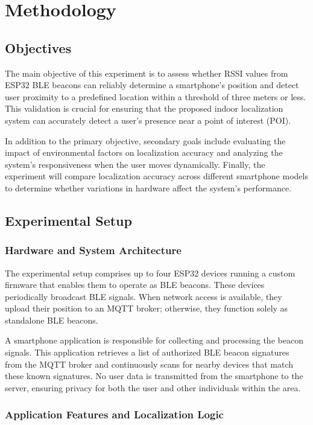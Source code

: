 \chapter{Methodology}
\label{chap:methodology}

\section{Objectives}

The main objective of this experiment is to assess whether RSSI values from ESP32 BLE beacons can reliably determine a smartphone’s position and detect user proximity to a predefined location within a threshold of three meters or less. This validation is crucial for ensuring that the proposed indoor localization system can accurately detect a user's presence near a point of interest (POI).

In addition to the primary objective, secondary goals include evaluating the impact of environmental factors on localization accuracy and analyzing the system’s responsiveness when the user moves dynamically. Finally, the experiment will compare localization accuracy across different smartphone models to determine whether variations in hardware affect the system’s performance.

\section{Experimental Setup}

\subsection{Hardware and System Architecture}

The experimental setup comprises up to four ESP32 devices running a custom firmware that enables them to operate as BLE beacons. These devices periodically broadcast BLE signals. When network access is available, they upload their position to an MQTT broker; otherwise, they function solely as standalone BLE beacons.

A smartphone application is responsible for collecting and processing the beacon signals. This application retrieves a list of authorized BLE beacon signatures from the MQTT broker and continuously scans for nearby devices that match these known signatures. No user data is transmitted from the smartphone to the server, ensuring privacy for both the user and other individuals within the area.

\subsection{Application Features and Localization Logic}

